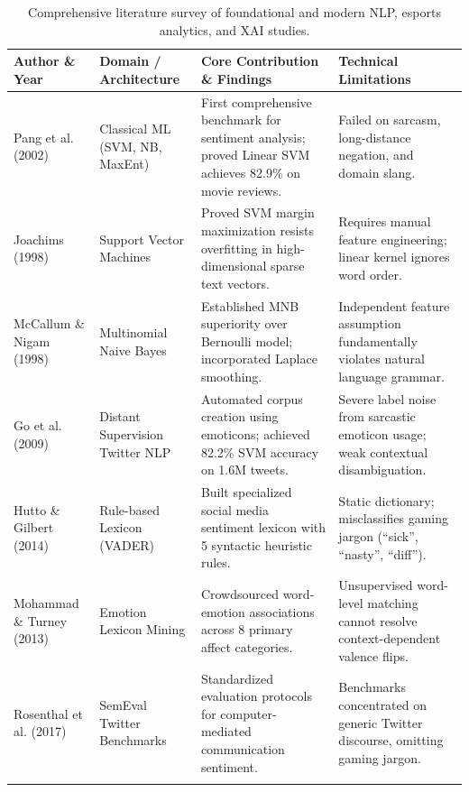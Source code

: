 \begin{table}[htbp]
\centering
\scriptsize
\caption{Comprehensive literature survey of foundational and modern NLP, esports analytics, and XAI studies.}
\label{tab:literature_survey}
\begin{tabularx}{\textwidth}{P{2.6cm} P{2.8cm} L L}
\toprule
\textbf{Author \& Year} & \textbf{Domain / Architecture} & \textbf{Core Contribution \& Findings} & \textbf{Technical Limitations} \\
\midrule
Pang et al. (2002) \cite{pang2002thumbs} & Classical ML (SVM, NB, MaxEnt) & First comprehensive benchmark for sentiment analysis; proved Linear SVM achieves 82.9\% on movie reviews. & Failed on sarcasm, long-distance negation, and domain slang. \\
\addlinespace
Joachims (1998) \cite{joachims1998text} & Support Vector Machines & Proved SVM margin maximization resists overfitting in high-dimensional sparse text vectors. & Requires manual feature engineering; linear kernel ignores word order. \\
\addlinespace
McCallum \& Nigam (1998) \cite{mccallum1998comparison} & Multinomial Naive Bayes & Established MNB superiority over Bernoulli model; incorporated Laplace smoothing. & Independent feature assumption fundamentally violates natural language grammar. \\
\addlinespace
Go et al. (2009) \cite{go2009twitter} & Distant Supervision Twitter NLP & Automated corpus creation using emoticons; achieved 82.2\% SVM accuracy on 1.6M tweets. & Severe label noise from sarcastic emoticon usage; weak contextual disambiguation. \\
\addlinespace
Hutto \& Gilbert (2014) \cite{hutto2014vader} & Rule-based Lexicon (VADER) & Built specialized social media sentiment lexicon with 5 syntactic heuristic rules. & Static dictionary; misclassifies gaming jargon (``sick'', ``nasty'', ``diff''). \\
\addlinespace
Mohammad \& Turney (2013) \cite{mohammad2013crowdsourcing} & Emotion Lexicon Mining & Crowdsourced word-emotion associations across 8 primary affect categories. & Unsupervised word-level matching cannot resolve context-dependent valence flips. \\
\addlinespace
Rosenthal et al. (2017) \cite{rosenthal2017semeval} & SemEval Twitter Benchmarks & Standardized evaluation protocols for computer-mediated communication sentiment. & Benchmarks concentrated on generic Twitter discourse, omitting gaming jargon. \\
\addlinespace

\end{tabularx}
\end{table}
